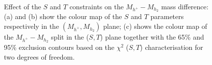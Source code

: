\documentclass[12pt,a4paper]{article}
\begin{document}
\begin{figure}[htb]
\centering
\hspace*{-0.3cm}%
\hspace*{-0.3cm}\\
\caption{
Effect of the  $S$ and $T$ constraints on the $M_{h^+}-M_{h_2}$ mass difference:
(a) and (b) show the 
colour map of the $S$ and  $T$ parameters respectively 
in the $(M_{h^+},M_{h_2})$ plane; (c) shows  the colour map
of the $M_{h^+}-M_{h_2}$ split in the ($S,T$) plane together with the
65\% and 95\% exclusion contours
based on the $\chi^2$ ($S,T$) characterisation for two degrees of freedom.} \label{fig:s-t-u}
\end{figure}
\end{document}
